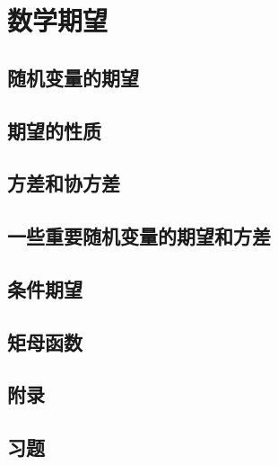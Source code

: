 \chapter{数学期望}

\section{随机变量的期望}

\pending

\section{期望的性质}

\pending

\section{方差和协方差}

\pending

\section{一些重要随机变量的期望和方差}

\pending

\section{条件期望}

\pending

\section{矩母函数}

\pending

\section{附录}

\pending

\section{习题}

\pending
